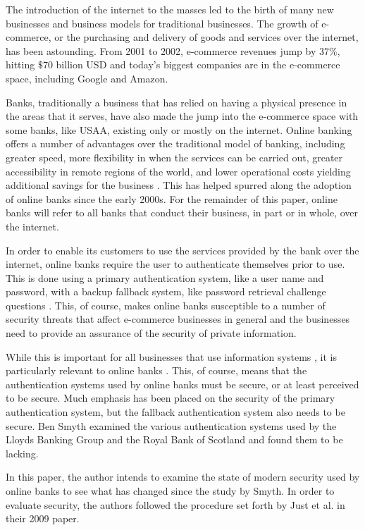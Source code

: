 \label{sec:background}

The introduction of the internet to the masses led to the birth of many new
businesses and business models for traditional businesses. The growth of
e-commerce, or the purchasing and delivery of goods and services over the
internet, has been astounding. From 2001 to 2002, e-commerce revenues jump by
$37\%$, hitting $\$70$ billion USD \cite{cheng2006adoption} and today's biggest
companies are in the e-commerce space, including Google and Amazon.

Banks, traditionally a business that has relied on having a physical presence 
in the areas that it serves, have also made the jump into the e-commerce 
space with some banks, like USAA, existing only or mostly on the internet. 
Online banking offers a number of advantages over the traditional model of
banking, including greater speed, more flexibility in when the services can be
carried out, greater accessibility in remote regions of the world, and lower
operational costs yielding additional savings for the business
\cite{oghenerukeybe2009customers}. This has helped spurred along the adoption of
online banks since the early 2000s. For the remainder of this paper, online
banks will refer to all banks that conduct their business, in part or in whole,
over the internet.

In order to enable its customers to use the services provided by the bank over
the internet, online banks require the user to authenticate themselves prior to
use. This is done using a primary authentication system, like a user name and
password, with a backup fallback system, like password retrieval challenge
questions \cite{kleuckerfallback}. This, of course, makes online banks
susceptible to a number of security threats that affect e-commerce businesses in
general \cite{kleuckerfallback} and the businesses need to provide an assurance
of the security of private information.

While this is important for all 
businesses that use information systems \cite{suh2003effect} 
\cite{cheng2006adoption} \cite{oghenerukeybe2009customers}
\cite{aladwani2001online}, it is particularly relevant to online banks
\cite{oghenerukeybe2009customers}. This, of course, means that the
authentication systems used by online banks must be secure, or at least 
perceived to be secure. Much emphasis has been placed on the security of the
primary authentication system, but the fallback authentication system also
needs to be secure. Ben Smyth \cite{smyth2010forgotten} examined the
various authentication systems used by the Lloyds Banking Group and the Royal
Bank of Scotland and found them to be lacking.

In this paper, the author
intends to examine the state of modern security used by online banks to see
what has changed since the study by Smyth. In order to evaluate security,
the authors followed the procedure set forth by Just et al.
\cite{just2009personal} in their 2009 paper.